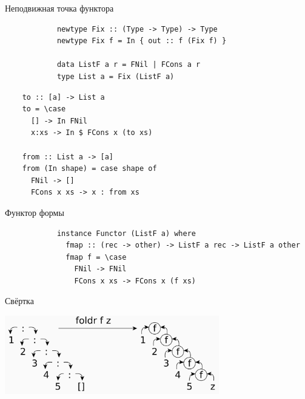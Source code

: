    \begin{frame}[fragile]{Неподвижная точка функтора}
        \pause
        \begin{verbatim}
            newtype Fix :: (Type -> Type) -> Type
            newtype Fix f = In { out :: f (Fix f) }

            data ListF a r = FNil | FCons a r
            type List a = Fix (ListF a)
        \end{verbatim}
        \pause\vspace{1em}
        \begin{verbatim}
    to :: [a] -> List a
    to = \case
      [] -> In FNil
      x:xs -> In $ FCons x (to xs)

    from :: List a -> [a]
    from (In shape) = case shape of
      FNil -> []
      FCons x xs -> x : from xs
        \end{verbatim}
    \end{frame}

    \begin{frame}[fragile]{Функтор формы}
        \pause
        \begin{verbatim}
            instance Functor (ListF a) where
              fmap :: (rec -> other) -> ListF a rec -> ListF a other
              fmap f = \case
                FNil -> FNil
                FCons x xs -> FCons x (f xs)
        \end{verbatim}
    \end{frame}

    \begin{frame}[fragile]{Свёртка}
        \pause
        \begin{center}
            \includegraphics[width=0.7\textwidth]{figs/foldr}
        \end{center}
    \end{frame}

